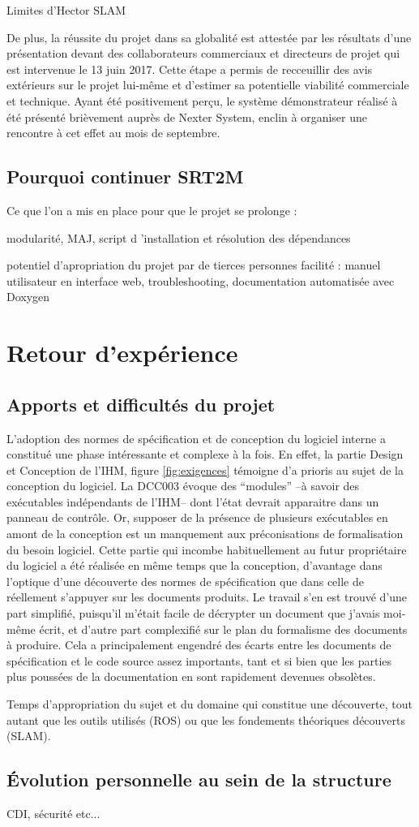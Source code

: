   
  Limites d'Hector SLAM 
  
  De plus, la réussite du projet dans sa globalité est attestée par les résultats d'une présentation devant des collaborateurs commerciaux et directeurs de projet qui est intervenue le 13 juin 2017.
  Cette étape a permis de recceuillir des avis extérieurs sur le projet lui-même et d'estimer sa potentielle viabilité commerciale et technique. 
  Ayant été positivement perçu, le système démonstrateur réalisé à été présenté brièvement auprès de Nexter System, enclin à organiser une rencontre à cet effet au mois de septembre. 
  
  
  \subsection{Pourquoi continuer SRT2M}
  
  Ce que l'on a mis en place pour que le projet se prolonge : 
  
  modularité, MAJ, script d 'installation et résolution des dépendances 
  
  potentiel d'apropriation du projet par de tierces personnes facilité : manuel utilisateur en interface web, troubleshooting, documentation automatisée avec Doxygen
  
\section{Retour d'expérience}
  \subsection{Apports et difficultés du projet}
  
  L'adoption des normes de spécification et de conception du logiciel interne a constitué une phase intéressante et complexe à la fois. 
  En effet, la partie Design et Conception de l'IHM, figure \ref{fig:exigences} témoigne d'a prioris au sujet de la conception du logiciel. 
  La DCC003 évoque des ``modules'' --à savoir des exécutables indépendants de l'IHM-- dont l'état devrait apparaitre dans un panneau de contrôle. 
  Or, supposer de la présence de plusieurs exécutables en amont de la conception est un manquement aux préconisations de formalisation du besoin logiciel. 
  Cette partie qui incombe habituellement au futur propriétaire du logiciel a été réalisée en même temps que la conception, d'avantage dans l'optique d'une découverte des normes de spécification que dans celle de réellement 
  s'appuyer sur les documents produits. Le travail s'en est trouvé d'une part simplifié, puisqu'il m'était facile de décrypter un document que j'avais moi-même écrit, et d'autre part complexifié sur le plan du formalisme
  des documents à produire. Cela a principalement engendré des écarts entre les documents de spécification et le code source assez importants, tant et si bien que les parties plus poussées de la documentation en sont 
  rapidement devenues obsolètes. 
  
  Temps d'appropriation du sujet et du domaine qui constitue une découverte, tout autant que les outils utilisés (ROS) ou que les fondements théoriques découverts (SLAM). 
  
  \subsection{\'{E}volution personnelle au sein de la structure}
  
  CDI, sécurité etc... 